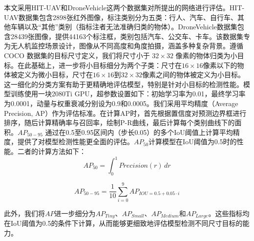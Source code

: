 本文采用HIT-UAV\cite{Suo2023HIT-UAV}和DroneVehicle\cite{Sun2022DroneVehicle}这两个数据集对所提出的网络进行评估。HIT-UAV数据集包含2898张红外图像，标注类别分为五类：行人、汽车、自行车、其他车辆以及“其他”类别（指标注者无法准确归类的物体）。DroneVehicle数据集包含28439张图像，提供44163个标注框，类别包括汽车、公交车、卡车。该数据集专为无人机监控场景设计，图像从不同高度和角度拍摄，涵盖多种复杂背景。遵循 COCO 数据集的目标尺寸定义，我们将尺寸小于 $32\times32$ 像素的物体归类为小目标。在此基础上，进一步将小目标细分为两个子类：尺寸在$16\times16$像素以下的物体被定义为微小目标，尺寸在$16\times16$到$32\times32$像素之间的物体被定义为小目标。这一细化的分类方案有助于更精确地评估模型，特别是针对小目标的检测性能。模型训练使用一块2080Ti GPU，超参数设置如下：初始学习率为0.01，最终学习率为0.0001，动量与权重衰减分别设为0.9和0.0005。我们采用平均精度（Average Precision, AP）作为评估标准。在计算AP时，首先根据置信度对预测边界框进行排序，随后计算精确率与召回率，绘制P-R曲线，最后计算每个类别曲线下的面积。$AP_{50-95}$ 通过在0.5至0.95区间内（步长0.05）的多个IoU阈值上计算平均精度，提供了对模型检测性能更全面的评估。$AP_{50}$计算模型在IoU阈值为0.5时的性能。二者的计算方法如下：
\begin{equation}
\label{eq11}
AP_{50} = \int_0^1 Precision(r) \, dr
\end{equation}

\begin{equation}
\label{eq12}
AP_{50-95} = \frac{1}{10} \sum_{i=0}^9 AP_{IOU=0.5+0.05 \cdot i}
\end{equation}

此外，我们将$AP$进一步细分为$AP_{Tiny}$、$AP_{Small}$、$AP_{Medium}$和$AP_{Large}$。这些指标均在IoU阈值为0.5的条件下计算，从而能够更细致地评估模型检测不同尺寸目标的能力。

